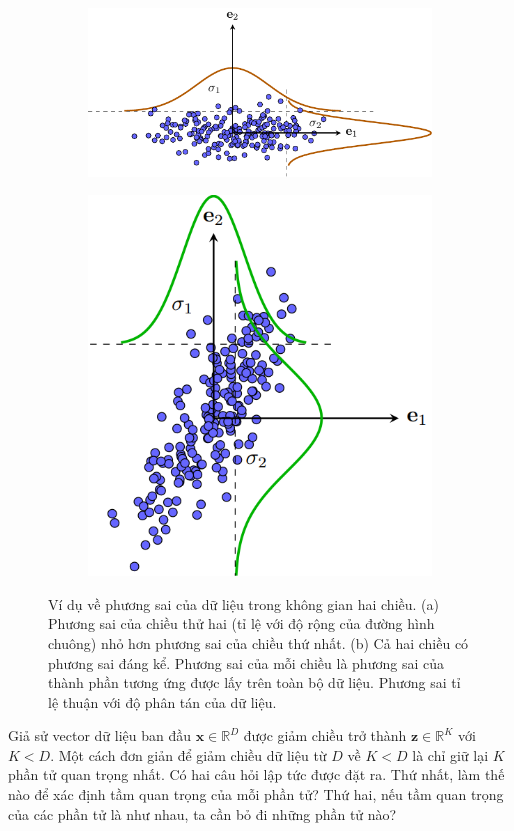 \documentclass[14pt,oneside,a4paper]{report}
\numberwithin{equation}{section}
\def\R{\mathbb{R}}
\begin{document}
\begin{figure}[t]
\begin{subfigure}{0.59\textwidth}
	\includegraphics[width=0.99\linewidth]{pca_diagvar.pdf}
	\caption{}
	\label{fig:pca_2a}
\end{subfigure}
\begin{subfigure}{0.33\textwidth}
	\includegraphics[width=0.99\linewidth]{pca_var.png}
	\caption{}
	\label{fig:pca_2b}
\end{subfigure}
\caption{Ví dụ về phương sai của dữ liệu trong không gian hai chiều. (a)
	Phương sai của chiều thử hai (tỉ lệ với độ rộng của đường hình chuông) nhỏ
	hơn phương sai của chiều thứ nhất. (b) Cả hai chiều có phương sai đáng kể. Phương sai của
	mỗi chiều là phương sai của thành phần tương ứng được lấy trên toàn bộ dữ
	liệu. Phương sai tỉ lệ thuận với độ phân tán của dữ liệu.}
\label{fig:pca_2}
\end{figure}
Giả sử vector dữ liệu ban đầu $\mathbf{x} \in \R^{D}$ được giảm chiều trở thành $\mathbf{z}
\in \R^K$ với $K < D$. Một cách đơn giản để giảm chiều dữ liệu từ $D$ về $K < D$ là chỉ giữ lại $K$ phần tử {quan trọng nhất}. Có hai câu hỏi lập tức
được đặt ra. Thứ nhất, làm thế nào để xác định {tầm quan trọng} của
mỗi phần tử? Thứ hai, nếu tầm quan trọng của các phần tử là như
nhau, ta cần bỏ đi những phần tử nào?
\end{document}
